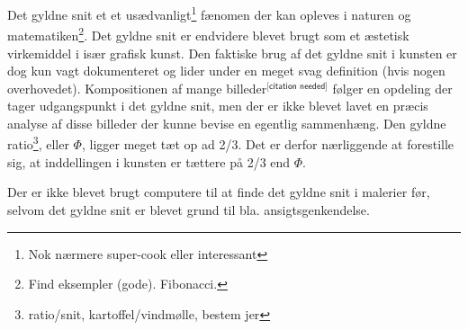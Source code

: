 Det gyldne snit et et usædvanligt\footnote{Nok nærmere super-cook eller
interessant} fænomen der kan opleves i naturen og
matematiken\footnote{Find eksempler (gode). Fibonacci.}. Det gyldne snit
er endvidere blevet brugt som et æstetisk virkemiddel i især grafisk
kunst. Den faktiske brug af det gyldne snit i kunsten er dog kun vagt
dokumenteret og lider under en meget svag definition (hvis nogen
overhovedet). Kompositionen af mange billeder$^{\textsf{[citation
needed]}}$ følger en opdeling der tager udgangspunkt i det gyldne snit,
men der er ikke blevet lavet en præcis analyse af disse billeder der
kunne bevise en egentlig sammenhæng. Den gyldne
ratio\footnote{ratio/snit, kartoffel/vindmølle, bestem jer}, eller
$\Phi$, ligger meget tæt op ad 2/3. Det er derfor nærliggende at
forestille sig, at inddellingen i kunsten er tættere på 2/3 end $\Phi$.

Der er ikke blevet brugt computere til at finde det gyldne snit i
malerier før, selvom det gyldne snit er blevet grund til bla.
ansigtsgenkendelse.
